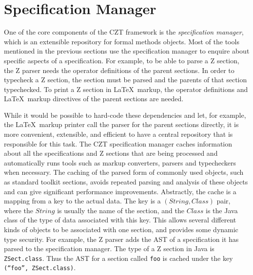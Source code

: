 \documentclass{llncs}
\newcommand{\Interface}[1]{\texttt{#1}}
\begin{document}
\section{Specification Manager}
\label{section-manager}

  One of the core components of the CZT framework is the
  \emph{specification manager}, which is an extensible repository for
  formal methods objects.  Most of the tools mentioned in the previous
  sections use the specification manager to enquire about specific
  aspects of a specification.  For example, to be able to parse a Z
  section, the Z parser needs the operator definitions of the parent
  sections.  In order to typecheck a Z section, the section must be
  parsed and the parents of that section typechecked.  To print a Z
  section in \LaTeX\ markup, the operator definitions and \LaTeX\
  markup directives of the parent sections are needed.

  While it would be possible to hard-code these dependencies and let,
  for example, the \LaTeX\ markup printer call the parser for the
  parent sections directly, it is more convenient, extensible, and
  efficient to have a central repository that is responsible for this
  task.  The CZT specification manager caches information about all
  the specifications and Z sections that are being processed and
  automatically runs tools such as markup converters, parsers and
  typecheckers when necessary.  The caching of the parsed form of
  commonly used objects, such as standard toolkit sections, avoids
  repeated parsing and analysis of these objects and can give
  significant performance improvements.  Abstractly, the cache is a
  mapping from a key to the actual data.  The key is a
  $(String,Class)$ pair, where the $String$ is usually the name of the
  section, and the $Class$ is the Java class of the type of data
  associated with this key.  This allows several different kinds of
  objects to be associated with one section, and provides some dynamic
  type security.  For example, the Z parser adds the AST of a
  specification it has parsed to the specification manager.  The type
  of a Z section in Java is \Interface{ZSect.class}. Thus the AST for
  a section called \texttt{foo} is cached under the key
  \texttt{(``foo'',~ZSect.class)}.
\end{document}
